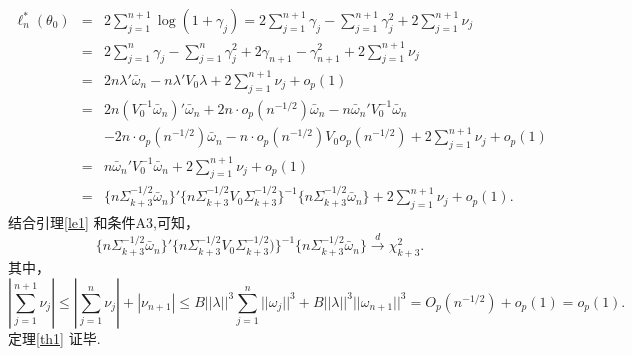 \documentclass[a4paper,c5size,onecolumn,twoside,cap,Chinese]{APSart}
\begin{document}
\begin{eqnarray*}
\ell^*_n(\theta_0)& = & 2\sum_{j=1}^{n+1} \log(1+\gamma_j)=2\sum_{j=1}^{n+1}\gamma_j-\sum_{j=1}^{n+1}\gamma_j^2+2\sum_{j=1}^{n+1}\nu_j\\
& = & 2\sum_{j=1}^{n}\gamma_j-\sum_{j=1}^{n}\gamma_j^2+2\gamma_{n+1}-\gamma^2_{n+1}+2\sum_{j=1}^{n+1}\nu_j\\
& = & 2n\lambda'\bar{\omega}_n-n\lambda'V_0\lambda+2\sum_{j=1}^{n+1}\nu_j +o_p(1)\\
& = & 2n(V_0^{-1}\bar{\omega}_{n})'\bar{\omega}_n+2n\cdot o_p(n^{-1/2})\bar{\omega}_n-n\bar{\omega}_{n}'V_0^{-1}\bar{\omega}_{n}\\
&     &-2n\cdot o_p(n^{-1/2})\bar{\omega}_n-n \cdot o_p(n^{-1/2})V_0o_p(n^{-1/2})+2\sum_{j=1}^{n+1}\nu_j +o_p(1)\\
& = & n\bar{\omega}_{n}'V_0^{-1}\bar{\omega}_n+2\sum_{j=1}^{n+1}\nu_j +o_p(1)\\
&=&  \{n\Sigma^{-1/2}_{k+3}\bar{\omega}_{n}\}'\{n\Sigma^{-1/2}_{k+3} V_0 \Sigma^{-1/2}_{k+3}\}^{-1}\{n\Sigma^{-1/2}_{k+3}\bar{\omega}_{n}\}+2\sum_{j=1}^{n+1}\nu_j +o_p(1).
\end{eqnarray*}
结合引理\ref{le1} 和条件A3,可知，
$$
 \{n\Sigma^{-1/2}_{k+3}\bar{\omega}_{n}\}'  \{n\Sigma^{-1/2}_{k+3} V_0 \Sigma^{-1/2}_{k+3})\}^{-1}\{n\Sigma^{-1/2}_{k+3}\bar{\omega}_{n}\} \stackrel{d}{\longrightarrow}\chi^2_{k+3}.
$$
其中，
$$
|\sum_{j=1}^{n+1}\nu_j| \le |\sum_{j=1}^{n}\nu_j|+|\nu_{n+1}|\leq B ||\lambda||^3\sum_{j=1}^{n}||\omega_{j}||^3+B ||\lambda||^3||\omega_{n+1}||^3 =O_p(n^{-1/2})+o_p(1)=o_p(1).
$$
 定理\ref{th1} 证毕.
\end{document}
